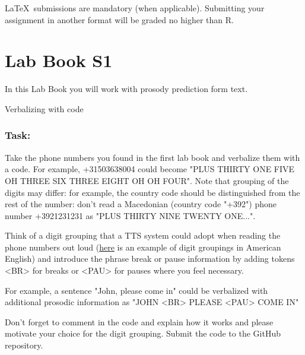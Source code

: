 \documentclass{../labbook}
\begin{document}
\begin{mdframed}[backgroundcolor=blue!20]
\LaTeX ~submissions are mandatory (when applicable). Submitting your assignment in another format will be graded no higher than R.
\end{mdframed}

\section{Lab Book S1}
In this Lab Book you will work with prosody prediction form text. 

\begin{problem}{1}{10}{Verbalizing with code}

\subsubsection*{Task:}
Take the phone numbers you found in the first lab book and verbalize them with a code. 
For example, +31503638004 could become "PLUS THIRTY ONE FIVE OH THREE SIX THREE EIGHT OH OH FOUR".
Note that grouping of the digits may differ: for example, the country code should be distinguished from the rest of the number:
don't read a Macedonian (country code "+392") phone number +3921231231 as "PLUS THIRTY NINE TWENTY ONE...".

Think of a digit grouping that a TTS system could adopt when reading the phone numbers out loud (\href{https://youtu.be/2OX8znJHNo0?si=EG2d8ElbaailUEhU}{here} is an example of digit groupings in American English)
and introduce the phrase break or pause information by adding tokens <BR> for breaks or <PAU> for pauses where you feel necessary. 

For example, a sentence "John, please come in" could be verbalized with additional prosodic information as "JOHN <BR> PLEASE <PAU> COME IN"

Don't forget to comment in the code and explain how it works and please motivate your choice for the digit grouping. 
Submit the code to the GitHub repository. 
\end{problem}
\end{document}
